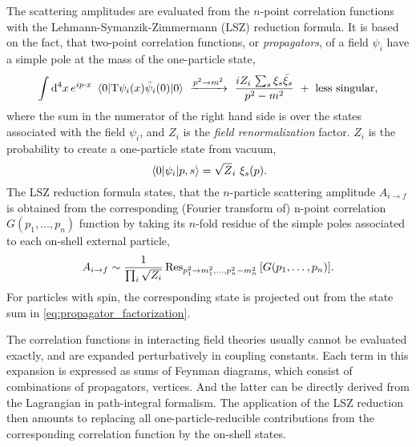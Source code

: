 The scattering amplitudes are evaluated from the $n$-point correlation functions
with the Lehmann-Symanzik-Zimmermann (LSZ) \cite{Lehmann:1954rq} reduction formula.
It is based on the fact, that two-point correlation functions, or \emph{propagators}, of a field $\psi_i$ have a simple
pole at the mass of the one-particle state,
\begin{equation} \label{eq:propagator_factorization}
  \int \dd[4]{x} e^{i \sp(p,x)} ~ \expval{\mathrm{T} \psi_i (x) \bar{\psi}_i(0)}{0} ~\xrightarrow{p^2\to m^2}~ \frac{i Z_i\,\sum_s \xi_s \bar{\xi}_s}{p^2-m^2} ~+~ \text{less singular},
\end{equation}
where the sum in the numerator of the right hand side is over the states associated with the field $\psi_i$, and
$Z_i$ is the \emph{field renormalization} factor.
$Z_i$ is the probability to create a one-particle state from vacuum,
\begin{equation}
  \mel{0}{\psi_i}{p,s} = \sqrt{Z}_i ~ \xi_s(p).
\end{equation}
The LSZ reduction formula states, that
the $n$-particle scattering amplitude $A_{i\to f}$ is obtained 
from the corresponding (Fourier transform of) n-point correlation $G(p_1,\ldots{},p_n)$ function
by taking its $n$-fold residue 
of the simple poles associated to each on-shell external particle,
\begin{equation}
  A_{i\to f} \sim \frac{1}{\prod_i \sqrt{Z_i} }\Res_{p_1^2\to m_1^2,\ldots{},p_n^2-m_n^2}\qty[G(p_1,\ldots{},p_n)].
\end{equation}
For particles with spin, the corresponding state is projected out from the state sum in \cref{eq:propagator_factorization}.


The correlation functions in interacting field theories usually cannot be evaluated exactly,
and are expanded perturbatively in coupling constants.
Each term in this expansion is expressed as sums of Feynman diagrams,
which consist of combinations of propagators, vertices.
And the latter can be directly derived from the Lagrangian in path-integral formalism.
The application of the LSZ reduction then amounts to replacing all one-particle-reducible contributions from the corresponding correlation function
by the on-shell states.

